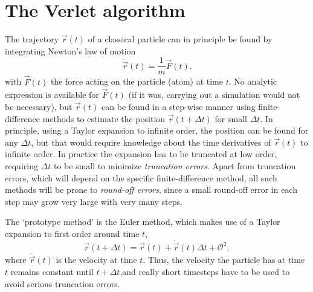 \documentclass[11pt,bibliography=totoc,index=totoc]{scrbook}   %
\begin{document}
\section{The Verlet algorithm}\label{seq:verlet-algo}

The trajectory $\vec{r}(t)$ of a classical particle can in principle be found by integrating Newton's law of motion
\begin{equation}
  \ddot{\vec{r}}(t) = \frac{1}{m}\vec{F}(t).
\end{equation}
with $\vec{F}(t)$ the force acting on the particle (atom) at time $t$. 
No analytic expression is available for $\vec{F}(t)$ (if it was, carrying out a simulation would not be necessary),
but $\vec{r}(t)$ can be found in a step-wise manner using finite-difference methods 
to estimate the position $\vec{r}(t+\Delta t)$ for small $\Delta t$. 
In principle, using a Taylor expansion to infinite order, the position can be found for any $\Delta t$, but that would require knowledge about the time derivatives of $\vec{r}(t)$ to infinite order. 
In practice the expansion has to be truncated at low order, requiring $\Delta t$ to be small to minimize \emph{truncation errors}.
Apart from truncation errors, which will depend on the specific finite-difference method, all such methods will be prone to \emph{round-off errors}, since a small round-off error in each step may grow very large with very many steps.

The `prototype method' is the Euler method, which makes use of a Taylor expansion to first order around time $t$,
\begin{equation}
  \vec{r}(t+\Delta t) = \vec{r}(t) + \dot{\vec{r}}(t)\Delta t + \mathcal{O}^2,
\end{equation}
where $\dot{\vec{r}}(t)$ is the velocity at time $t$. Thus, the velocity the particle has at time $t$ remains constant until $t+\Delta t$,and really short timesteps have to be used to avoid serious truncation errors.
\end{document}
